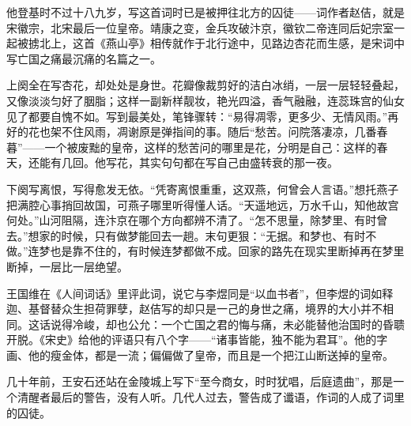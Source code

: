 \begin{appreciation}
他登基时不过十八九岁，写这首词时已是被押往北方的囚徒——词作者赵佶，就是宋徽宗，北宋最后一位皇帝。靖康之变，金兵攻破汴京，徽钦二帝连同后妃宗室一起被掳北上，这首《燕山亭》相传就作于北行途中，见路边杏花而生感，是宋词中写亡国之痛最沉痛的名篇之一。

上阕全在写杏花，却处处是身世。花瓣像裁剪好的洁白冰绡，一层一层轻轻叠起，又像淡淡匀好了胭脂；这样一副新样靓妆，艳光四溢，香气融融，连蕊珠宫的仙女见了都要自愧不如。写到最美处，笔锋骤转：“易得凋零，更多少、无情风雨。”再好的花也架不住风雨，凋谢原是弹指间的事。随后“愁苦。问院落凄凉，几番春暮”——一个被废黜的皇帝，这样的愁苦问的哪里是花，分明是自己：这样的春天，还能有几回。他写花，其实句句都在写自己由盛转衰的那一夜。

下阕写离恨，写得愈发无依。“凭寄离恨重重，这双燕，何曾会人言语。”想托燕子把满腔心事捎回故国，可燕子哪里听得懂人话。“天遥地远，万水千山，知他故宫何处。”山河阻隔，连汴京在哪个方向都辨不清了。“怎不思量，除梦里、有时曾去。”想家的时候，只有做梦能回去一趟。末句更狠：“无据。和梦也、有时不做。”连梦也是靠不住的，有时候连梦都做不成。回家的路先在现实里断掉再在梦里断掉，一层比一层绝望。

王国维在《人间词话》里评此词，说它与李煜同是“以血书者”，但李煜的词如释迦、基督替众生担荷罪孽，赵佶写的却只是一己的身世之痛，境界的大小并不相同。这话说得冷峻，却也公允：一个亡国之君的悔与痛，未必能替他治国时的昏聩开脱。《宋史》给他的评语只有八个字——“诸事皆能，独不能为君耳”。他的字画、他的瘦金体，都是一流；偏偏做了皇帝，而且是一个把江山断送掉的皇帝。

几十年前，王安石还站在金陵城上写下“至今商女，时时犹唱，后庭遗曲”，那是一个清醒者最后的警告，没有人听。几代人过去，警告成了谶语，作词的人成了词里的囚徒。
\end{appreciation}

